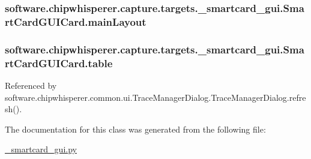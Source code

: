 \subsubsection[{main\+Layout}]{\setlength{\rightskip}{0pt plus 5cm}software.\+chipwhisperer.\+capture.\+targets.\+\_\+smartcard\+\_\+gui.\+Smart\+Card\+G\+U\+I\+Card.\+main\+Layout}\label{classsoftware_1_1chipwhisperer_1_1capture_1_1targets_1_1__smartcard__gui_1_1SmartCardGUICard_a38289fa3967d2704d23c215623b9be3a}
\hypertarget{classsoftware_1_1chipwhisperer_1_1capture_1_1targets_1_1__smartcard__gui_1_1SmartCardGUICard_a7b880ab37bcf33449742c93207300994}{}
\subsubsection[{table}]{\setlength{\rightskip}{0pt plus 5cm}software.\+chipwhisperer.\+capture.\+targets.\+\_\+smartcard\+\_\+gui.\+Smart\+Card\+G\+U\+I\+Card.\+table}\label{classsoftware_1_1chipwhisperer_1_1capture_1_1targets_1_1__smartcard__gui_1_1SmartCardGUICard_a7b880ab37bcf33449742c93207300994}


Referenced by software.\+chipwhisperer.\+common.\+ui.\+Trace\+Manager\+Dialog.\+Trace\+Manager\+Dialog.\+refresh().



The documentation for this class was generated from the following file\+:\begin{DoxyCompactItemize}
\item 
\hyperlink{__smartcard__gui_8py}{\+\_\+smartcard\+\_\+gui.\+py}\end{DoxyCompactItemize}
